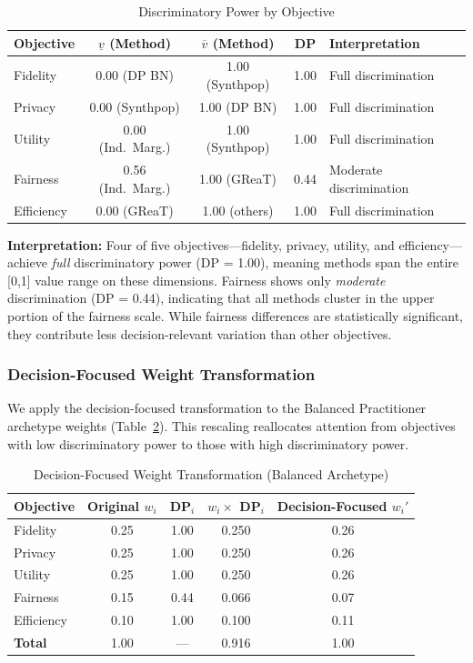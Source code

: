 \documentclass[12pt,a4paper]{article}
\begin{document}
\begin{table}[htbp]
\centering
\caption{Discriminatory Power by Objective}
\label{tab:discriminatory}
\begin{tabular}{@{}lcccl@{}}
\toprule
\textbf{Objective} & $\underline{v}$ (Method) & $\overline{v}$ (Method) & \textbf{DP} & \textbf{Interpretation} \\
\midrule
Fidelity & 0.00 (DP BN) & 1.00 (Synthpop) & 1.00 & Full discrimination \\
Privacy & 0.00 (Synthpop) & 1.00 (DP BN) & 1.00 & Full discrimination \\
Utility & 0.00 (Ind.\ Marg.) & 1.00 (Synthpop) & 1.00 & Full discrimination \\
Fairness & 0.56 (Ind.\ Marg.) & 1.00 (GReaT) & 0.44 & Moderate discrimination \\
Efficiency & 0.00 (GReaT) & 1.00 (others) & 1.00 & Full discrimination \\
\bottomrule
\end{tabular}
\end{table}

\textbf{Interpretation:} Four of five objectives---fidelity, privacy, utility, and efficiency---achieve \textit{full} discriminatory power (DP = 1.00), meaning methods span the entire [0,1] value range on these dimensions. Fairness shows only \textit{moderate} discrimination (DP = 0.44), indicating that all methods cluster in the upper portion of the fairness scale. While fairness differences are statistically significant, they contribute less decision-relevant variation than other objectives.

\subsubsection{Decision-Focused Weight Transformation}

We apply the decision-focused transformation to the Balanced Practitioner archetype weights (Table~\ref{tab:df_weights}). This rescaling reallocates attention from objectives with low discriminatory power to those with high discriminatory power.

\begin{table}[htbp]
\centering
\caption{Decision-Focused Weight Transformation (Balanced Archetype)}
\label{tab:df_weights}
\begin{tabular}{@{}lcccc@{}}
\toprule
\textbf{Objective} & \textbf{Original $w_i$} & \textbf{DP$_i$} & \textbf{$w_i \times$ DP$_i$} & \textbf{Decision-Focused $w_i'$} \\
\midrule
Fidelity & 0.25 & 1.00 & 0.250 & 0.26 \\
Privacy & 0.25 & 1.00 & 0.250 & 0.26 \\
Utility & 0.25 & 1.00 & 0.250 & 0.26 \\
Fairness & 0.15 & 0.44 & 0.066 & 0.07 \\
Efficiency & 0.10 & 1.00 & 0.100 & 0.11 \\
\midrule
\textbf{Total} & 1.00 & --- & 0.916 & 1.00 \\
\bottomrule
\end{tabular}
\end{table}
\end{document}
